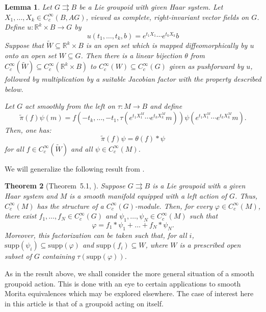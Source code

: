 \documentclass[12pt]{article}
\theoremstyle{plain}
\newtheorem{thm}{Theorem}[section]
\newtheorem{lemma}[thm]{Lemma}
\theoremstyle{definition}
\newcommand{\R}{\mathbb{R}}
\numberwithin{equation}{section}
\begin{document}
 \begin{lemma}
 Let $G\rightrightarrows B$ be a Lie groupoid with given Haar system. Let $X_1,\ldots,X_k \in C_c^\infty(B,AG)$, viewed as complete, right-invariant vector fields on $G$. Define $u:\R^k \times B \to G$ by 
\[ u(t_1,\ldots,t_k,b) = e^{t_1X_1}\cdots e^{t_kX_k}b \]
Suppose that $\widetilde W \subseteq \R^k \times B$ is an open set which is mapped diffeomorphically by $u$ onto an open set $W \subseteq G$. Then there is a linear bijection $\theta$ from $C_c^\infty(\widetilde W) \subseteq C_c^\infty(\R^k\times B)$ to $C_c^\infty(W) \subseteq C_c^\infty(G)$ given as pushforward by $u$, followed by multiplication by a suitable Jacobian factor with the property described below.

Let  $G$ act smoothly from the left on $\tau:M \to B$ and define 
\[ \widetilde\pi(f)\psi(m) = f(-t_k,\ldots,-t_1,\tau(e^{t_1X_1^M}\cdots e^{t_k X_k^M}m))\psi(e^{t_1X_1^M}\cdots e^{t_k X_k^M}m) .\]
Then, one has:
\[ \widetilde\pi(f) \psi = \theta(f) * \psi \]
for all $f \in C_c^\infty(\widetilde W)$ and all $\psi \in C_c^\infty(M)$.
 \end{lemma}






We will   generalize the following result from \cite{Francis[DM]}.




\begin{thm}[Theorem~5.1, \cite{Francis[DM]}]
Suppose $G \rightrightarrows B$ is a Lie groupoid with a given   Haar system and $M$ is a smooth manifold equipped with a left action of $G$. Thus, $C_c^\infty(M)$ has the structure of a $C_c^\infty(G)$-module. Then, for every $\varphi \in C_c^\infty(M)$, there exist $f_1,\ldots,f_N \in C_c^\infty(G)$ and $\psi_1, \ldots, \psi_N \in C_c^\infty(M)$ such that 
\[ \varphi = f_1 * \psi_1 + \ldots +  f_N * \psi_N. \] 
Moreover, this factorization can be taken such that, for all $i$, $\mathrm{supp}(\psi_i) \subseteq \mathrm{supp}(\varphi)$ and   $\mathrm{supp}(f_i) \subseteq W$, where $W$ is a prescribed open subset of $G$ containing $\tau( \mathrm{supp}(\varphi))$.
\end{thm}






As in the result above, we shall consider the more  general situation of a smooth groupoid action. This is done with an eye to certain applications to smooth Morita equivalences which may be explored elsewhere. The case of interest here in this article is that of a groupoid acting on itself.
\end{document}
